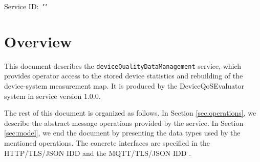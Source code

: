 \documentclass[a4paper]{arrowhead}
\begin{document}
\sloppy

\ArrowheadSetup

\begin{center}
  \vspace*{1cm}
  \huge{\arrowtitle}

  \vspace*{0.2cm}
  \LARGE{\arrowtype}
  \vspace*{1cm}

  \Large{Service ID: \textit{"\arrowid"}}

  \vspace*{\fill}


  \vspace*{1cm}
  \vspace*{\fill}

  \begin{abstract}
    This document describes the \texttt{device\allowbreak{}Quality\allowbreak{}Data\allowbreak{}Management} service, version 1.0.0, produced by the DeviceQoSEvaluator support system of Arrowhead 5.2.2.
  \end{abstract}

  \vspace*{1cm}
\end{center}

\newpage

\tableofcontents
\newpage

\section{Overview}
\label{sec:overview}

This document describes the \texttt{device\allowbreak{}Quality\allowbreak{}Data\allowbreak{}Management} service, which provides operator access to the stored device statistics and rebuilding of the device-system measurement map.
It is produced by the DeviceQoSEvaluator system \cite{dqe-sysd} in service version 1.0.0.

The rest of this document is organized as follows.
In Section \ref{sec:operations}, we describe the abstract message operations provided by the service.
In Section \ref{sec:model}, we end the document by presenting the data types used by the mentioned operations.
The concrete interfaces are specified in the HTTP/TLS/JSON IDD \cite{dqe-deviceQualityDataManagement-http-idd} and the MQTT/TLS/JSON IDD \cite{dqe-deviceQualityDataManagement-mqtt-idd}.
\end{document}
